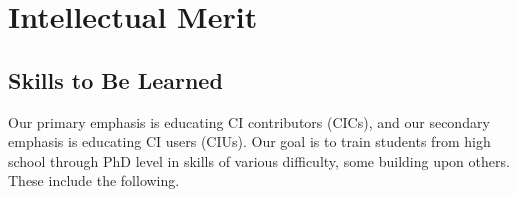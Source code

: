\documentclass[11pt]{NSFamsart}
\begin{document}

\section{Intellectual Merit}

\subsection{Skills to Be Learned} \label{SkillsLearned}
Our primary emphasis is educating CI contributors (CICs), and our secondary emphasis is educating CI users (CIUs).  Our goal is to train students from high school through PhD level in skills of various difficulty, some building upon others.  These include the following.
\end{document}
